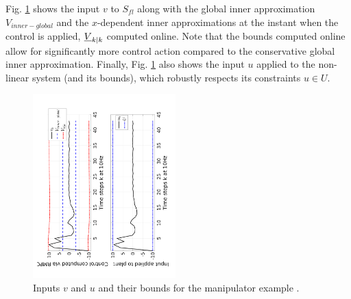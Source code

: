 



Fig. \ref{fig:v_and_limits} shows the input $v$ to $S_{fl}$ along with the global inner approximation $V_{inner-global}$ and the $x$-dependent inner approximations at the instant when the control is applied,  $\underline{V}_{k|k}$ computed online.
Note that the bounds computed online allow for significantly more control action compared to the conservative global inner approximation. 
Finally, Fig. \ref{fig:v_and_limits} also shows the input $u$ applied to the non-linear system (and its bounds), which robustly respects its constraints $u \in U$.



\begin{figure}
\includegraphics[angle=270,width=0.49\textwidth]{figs/u_and_v_manip.pdf}
\caption{Inputs $v$ and $u$ and their bounds for the manipulator example .}
\label{fig:v_and_limits}
\end{figure}



